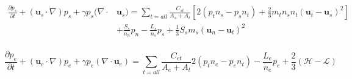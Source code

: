 \documentclass[journal, onecolumn]{aastex631}
\begin{document}
\begin{CJK*}{UTF8}{gbsn}
\begin{equation}\label{eq:i_prs_5}
\begin{aligned}
\frac{\partial p_{s}}{\partial t}+
(\textbf{u}_{s}\cdot\nabla)p_{s}+\gamma p_{s}(\nabla\cdot&\textbf{u}_{s})                                                                                                                                                                                                                                                                                                                                                                                      
=\sum_{t=all}\frac{C_{st}}{A_{s}+A_{t}}[2(p_{t}n_{s}-p_{s}n_{t})+
\frac{2}{3}m_{t}n_{s}n_{t}(\textbf{u}_{t}-\textbf{u}_{s})^2
]\\
&+\frac{S_{s}}{n_{n}}p_{n}-\frac{L_{s}}{n_{s}}p_{s}
+\frac{1}{3}S_{s}m_{s}(\textbf{u}_{n}-\textbf{u}_{t})^2\\
\end{aligned}
\end{equation}

\begin{equation}\label{eq:e_prs_6}
\frac{\partial p_{e}}{\partial t}+
(\textbf{u}_{e}\cdot\nabla)p_{e}+\gamma p_{e}(\nabla\cdot\textbf{u}_{e})                                                                                                                                                                                                                                                                                                                                                                                      
=\sum_{t=all}\frac{C_{et}}{A_{e}+A_{t}}2(p_{t}n_{e}-p_{e}n_{t})
-\frac{L_{e}}{n_{e}}p_{e}+\frac{2}{3}(\mathscr{H}-\mathscr{L})
\end{equation}


\end{CJK*}
\end{document}
